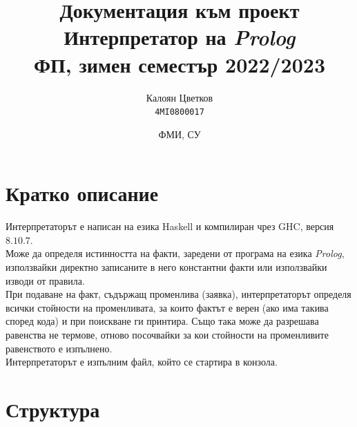 \documentclass[15pt]{extarticle}
\title{\Huge Документация към проект\\ \huge Интерпретатор на \emph{Prolog}\\ \large ФП, зимен семестър 2022/2023}
\author{Калоян Цветков\\ \texttt{4MI0800017}}
\date{ФМИ, СУ\\ \version}
\begin{document}
	
	\begin{titlingpage}
		\maketitle
	\end{titlingpage}
	\tableofcontents
	\newpage
	\large
	
	\section{Кратко описание}
	
	Интерпретаторът е написан на езика Haskell и компилиран чрез GHC, версия $8.10.7$.\\
	Може да определя истинността на факти, заредени от програма на езика \emph{Prolog}, използвайки директно записаните в него константни факти или използвайки изводи от правила.\\
	При подаване на факт, съдържащ променлива (заявка), интерпретаторът определя всички стойности на променливата, за които фактът е верен (ако има такива според кода) и при поискване ги принтира. Също така може да разрешава равенства не термове, отново посочвайки за кои стойности на променливите равенството е изпълнено.\\
	Интерпретаторът е изпълним файл, който се стартира в конзола.
	
	\section{Структура}
	
\end{document}
